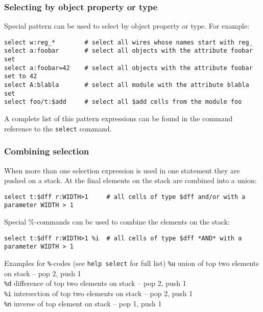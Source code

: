 \subsubsection{Selecting by object property or type}

\begin{frame}[fragile]{\subsubsecname}
Special pattern can be used to select by object property or type. For example:

\bigskip
\begin{lstlisting}[xleftmargin=0.5cm, basicstyle=\ttfamily\fontsize{8pt}{10pt}\selectfont, language=ys]
select w:reg_*        # select all wires whose names start with reg_
select a:foobar       # select all objects with the attribute foobar set
select a:foobar=42    # select all objects with the attribute foobar set to 42
select A:blabla       # select all module with the attribute blabla set
select foo/t:$add     # select all $add cells from the module foo
\end{lstlisting}

\bigskip
A complete list of this pattern expressions can be found in the command
reference to the {\tt select} command.
\end{frame}

\subsubsection{Combining selection}

\begin{frame}[fragile]{\subsubsecname}
When more than one selection expression is used in one statement they are
pushed on a stack. At the final elements on the stack are combined into a union:

\medskip
\begin{lstlisting}[xleftmargin=0.5cm, basicstyle=\ttfamily\fontsize{8pt}{10pt}\selectfont, language=ys]
select t:$dff r:WIDTH>1     # all cells of type $dff and/or with a parameter WIDTH > 1
\end{lstlisting}

\bigskip
Special \%-commands can be used to combine the elements on the stack:

\medskip
\begin{lstlisting}[xleftmargin=0.5cm, basicstyle=\ttfamily\fontsize{8pt}{10pt}\selectfont, language=ys]
select t:$dff r:WIDTH>1 %i  # all cells of type $dff *AND* with a parameter WIDTH > 1
\end{lstlisting}

\medskip
\begin{block}{Examples for {\tt \%}-codes (see {\tt help select} for full list)}
{\tt \%u} \dotfill union of top two elements on stack -- pop 2, push 1 \\
{\tt \%d} \dotfill difference of top two elements on stack -- pop 2, push 1 \\
{\tt \%i} \dotfill intersection of top two elements on stack -- pop 2, push 1 \\
{\tt \%n} \dotfill inverse of top element on stack -- pop 1, push 1 \\
\end{block}
\end{frame}

